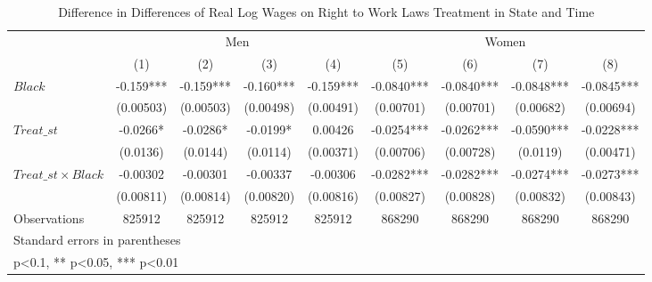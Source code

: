 \begin{table}[htbp]\centering
\def\sym#1{\ifmmode^{#1}\else\(^{#1}\)\fi}
\caption{Difference in Differences of Real Log Wages on Right to Work Laws Treatment in State and Time}
\begin{tabular}{l*{8}{c}}
\hline\hline
                    &\multicolumn{4}{c}{Men}                                        &\multicolumn{4}{c}{Women}                                      \\\cmidrule(lr){2-5}\cmidrule(lr){6-9}
                    &\multicolumn{1}{c}{(1)}   &\multicolumn{1}{c}{(2)}   &\multicolumn{1}{c}{(3)}   &\multicolumn{1}{c}{(4)}   &\multicolumn{1}{c}{(5)}   &\multicolumn{1}{c}{(6)}   &\multicolumn{1}{c}{(7)}   &\multicolumn{1}{c}{(8)}   \\
\hline
$ Black $           &      -0.159***&      -0.159***&      -0.160***&      -0.159***&     -0.0840***&     -0.0840***&     -0.0848***&     -0.0845***\\
                    &   (0.00503)   &   (0.00503)   &   (0.00498)   &   (0.00491)   &   (0.00701)   &   (0.00701)   &   (0.00682)   &   (0.00694)   \\
[1em]
$ Treat\_{st} $      &     -0.0266*  &     -0.0286*  &     -0.0199*  &     0.00426   &     -0.0254***&     -0.0262***&     -0.0590***&     -0.0228***\\
                    &    (0.0136)   &    (0.0144)   &    (0.0114)   &   (0.00371)   &   (0.00706)   &   (0.00728)   &    (0.0119)   &   (0.00471)   \\
[1em]
$ Treat\_{st} \times Black $&    -0.00302   &    -0.00301   &    -0.00337   &    -0.00306   &     -0.0282***&     -0.0282***&     -0.0274***&     -0.0273***\\
                    &   (0.00811)   &   (0.00814)   &   (0.00820)   &   (0.00816)   &   (0.00827)   &   (0.00828)   &   (0.00832)   &   (0.00843)   \\
\hline
Observations        &      825912   &      825912   &      825912   &      825912   &      868290   &      868290   &      868290   &      868290   \\
\hline\hline
\multicolumn{9}{l}{\footnotesize Standard errors in parentheses}\\
\multicolumn{9}{l}{\footnotesize * p<0.1, ** p<0.05, *** p<0.01}\\
\end{tabular}
\end{table}
